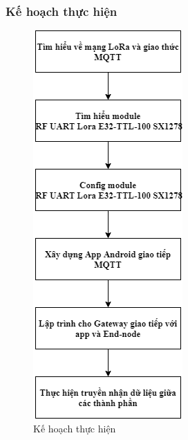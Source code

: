 \subsubsection{Kế hoạch thực hiện}
\begin{figure}
	\centering
	\includegraphics[scale=.5]{Chapter 1/image chapter 1/kehoachthuchien.png}
	\caption[Kế hoạch thực hiện]{Kế hoạch thực hiện}
	\label{hinh11}
\end{figure}
